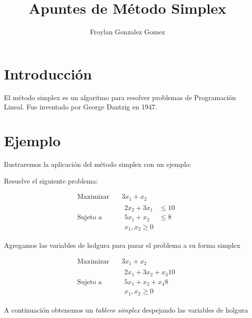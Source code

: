 \documentclass{article}
\title{Apuntes de Método Simplex}
\author{Froylan Gonzalez Gomez}
\begin{document}
\maketitle

\section{Introducción}

El método simplex es un algoritmo para resolver problemas de
Programación Lineal. Fue inventado por George Dantzig en 1947.

\section{Ejemplo}
Ilustraremos la aplicación del método simplex con un ejemplo:

Resuelve el siguiente problema:

\begin{equation}
  
  \begin{aligned}
    \text{Maximizar} \quad & 3x_1+x_2 \\
    \text{Sujeto a} \quad &
    
    \begin{aligned}
      2x_2+3x_1 & \leq 10 \\
      5x_1+x_2 & \leq 8 \\
      x_1,x_2  \geq 0

    \end{aligned}
  \end{aligned}
\end{equation}

Agregamos las variables de holgura para pasar el problema a su forma
simplex

\begin{equation}
  
  \begin{aligned}
    \text{Maximizar} \quad & 3x_1+x_2 \\
    \text{Sujeto a} \quad &
    
    \begin{aligned}
      2x_1+3x_2+x_3 10 \\
      5x_1+x_2+x_4 8 \\
      x_1,x_2  \geq 0

    \end{aligned}
  \end{aligned}
\end{equation}

    
A continuación obtenemos un \emph{tablero simplex} despejando las
variables de holgura     
    
\end{document}
